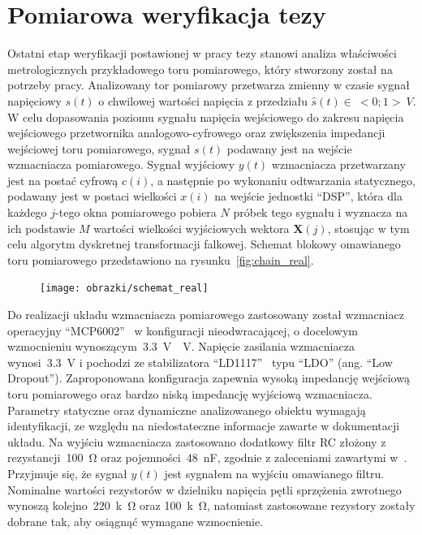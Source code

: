\chapter{Pomiarowa weryfikacja tezy}

Ostatni etap weryfikacji postawionej w pracy tezy stanowi analiza właściwości metrologicznych przykładowego toru pomiarowego, który stworzony został na potrzeby pracy. Analizowany tor pomiarowy przetwarza zmienny w czasie sygnał napięciowy $s(t)$ o chwilowej wartości napięcia z przedziału $\hat{s}(t) \in~<0;1>~\unit{V}$. W celu dopasowania poziomu sygnału napięcia wejściowego do zakresu napięcia wejściowego przetwornika analogowo-cyfrowego oraz zwiększenia impedancji wejściowej toru pomiarowego, sygnał $s(t)$ podawany jest na wejście wzmacniacza pomiarowego. Sygnał wyjściowy $y(t)$ wzmacniacza przetwarzany jest na postać cyfrową $c(i)$, a następnie po wykonaniu odtwarzania statycznego, podawany jest w postaci wielkości $x(i)$ na wejście jednostki \enquote{DSP}, która dla każdego $j$-tego okna pomiarowego pobiera $N$ próbek tego sygnału i wyznacza na ich podstawie $M$ wartości wielkości wyjściowych wektora $\mathbf{X}(j)$, stosując w tym celu algorytm dyskretnej transformacji falkowej. Schemat blokowy omawianego toru pomiarowego przedstawiono na rysunku~\ref{fig:chain_real}.

\begin{figure}[htb!]
\begin{center}
\texttt{[image: obrazki/schemat\_real]}
\end{center}
\end{figure}

Do realizacji układu wzmacniacza pomiarowego zastosowany został wzmacniacz operacyjny \enquote{MCP6002}~\cite{microchip_manual} w konfiguracji nieodwracającej, o docelowym wzmocnieniu wynoszącym~\qty{3.3}{V \per V}. Napięcie zasilania wzmacniacza wynosi~\qty{3.3}{V} i pochodzi ze stabilizatora \enquote{LD1117}~\cite{stm_manual} typu \enquote{LDO} (ang. \enquote{Low Dropout}). Zaproponowana konfiguracja zapewnia wysoką impedancję wejściową toru pomiarowego oraz bardzo niską impedancję wyjściową wzmacniacza. Parametry statyczne oraz dynamiczne analizowanego obiektu wymagają identyfikacji, ze względu na niedostateczne informacje zawarte w dokumentacji układu. Na wyjściu wzmacniacza zastosowano dodatkowy filtr RC złożony z rezystancji~\qty{100}{\ohm} oraz pojemności~\qty{48}{nF}, zgodnie z zaleceniami zawartymi w~\cite{baker_sar, microchip_application}. Przyjmuje się, że sygnał $y(t)$ jest sygnałem na wyjściu omawianego filtru. Nominalne wartości rezystorów w dzielniku napięcia pętli sprzężenia zwrotnego wynoszą kolejno~\qty{220}{k \ohm} oraz \qty{100}{k \ohm}, natomiast zastosowane rezystory zostały dobrane tak, aby osiągnąć wymagane wzmocnienie.

